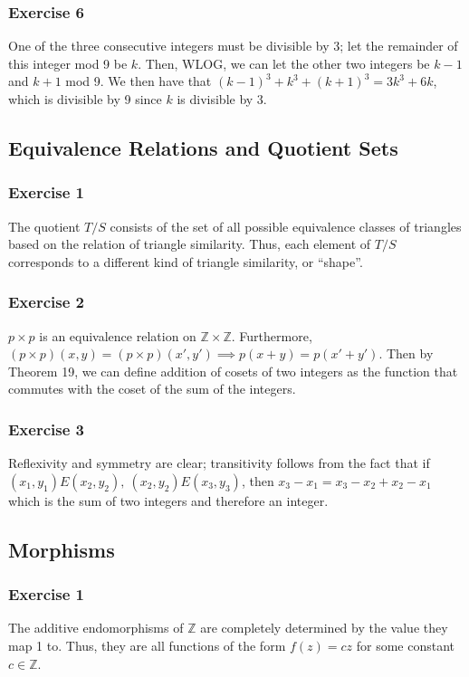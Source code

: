 \subsubsection{Exercise 6}
One of the three consecutive integers must be divisible by 3; let the remainder of this integer mod 9 be
$k$. Then, WLOG, we can let the other two integers be $k - 1$ and $k + 1$ mod 9. We then have that
$(k - 1)^3 + k^3 + (k + 1)^3 = 3k^3 + 6k$, which is divisible by 9 since $k$ is divisible by 3.

\subsection{Equivalence Relations and Quotient Sets}

\subsubsection{Exercise 1}
The quotient $T / S$ consists of the set of all possible equivalence classes of triangles
based on the relation of triangle similarity. Thus, each element of $T / S$ corresponds to a
different kind of triangle similarity, or ``shape''.

\subsubsection{Exercise 2}
$p \times p$ is an equivalence relation on $\mathbb{Z} \times \mathbb{Z}$. Furthermore,
$(p \times p) (x, y) = (p \times p) (x', y') \implies p(x + y) = p(x' + y')$.
Then by Theorem 19, we can define addition of cosets of two integers as the function
that commutes with the coset of the sum of the integers.

\subsubsection{Exercise 3}
Reflexivity and symmetry are clear; transitivity follows from the fact that if  $(x_1, y_1)E(x_2,y_2), \: 
(x_2, y_2)E(x_3, y_3)$, then $x_3 - x_1 = x_3 - x_2 + x_2 - x_1$ which is the sum of two integers and
therefore an integer. 

\subsection{Morphisms}

\subsubsection{Exercise 1}
The additive endomorphisms of $\mathbb{Z}$ are completely determined by the value they map 1 to.
Thus, they are all functions of the form $f(z) = c z$ for some constant $c \in \mathbb{Z}$.

